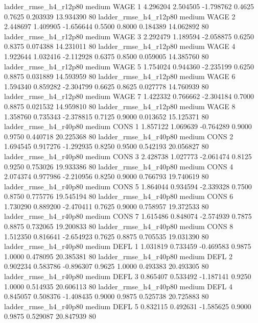  ladder_rmse_h4_r12p80     medium     WAGE                 1  4.296204 2.504505 -1.798762 0.4625 0.7625  0.203939   13.934390 80
 ladder_rmse_h4_r12p80     medium     WAGE                 2  2.448697 1.409905 -1.656644 0.5500 0.8000  0.184389   14.062892 80
 ladder_rmse_h4_r12p80     medium     WAGE                 3  2.292479 1.189594 -2.058875 0.6250 0.8375  0.074388   14.231011 80
 ladder_rmse_h4_r12p80     medium     WAGE                 4  1.922644 1.032416 -2.112928 0.6375 0.8500  0.059005   14.385760 80
 ladder_rmse_h4_r12p80     medium     WAGE                 5  1.754024 0.944360 -2.235199 0.6250 0.8875  0.031889   14.593959 80
 ladder_rmse_h4_r12p80     medium     WAGE                 6  1.594340 0.859282 -2.304799 0.6625 0.8625  0.027778   14.760939 80
 ladder_rmse_h4_r12p80     medium     WAGE                 7  1.422332 0.766662 -2.304184 0.7000 0.8875  0.021532   14.959810 80
 ladder_rmse_h4_r12p80     medium     WAGE                 8  1.358760 0.735343 -2.378815 0.7125 0.9000  0.013652   15.125371 80
 ladder_rmse_h4_r40p80     medium     CONS                 1  1.857122 1.069639 -0.764289 0.9000 0.9750  0.440718   20.225368 80
 ladder_rmse_h4_r40p80     medium     CONS                 2  1.694545 0.917276 -1.292935 0.8250 0.9500  0.542193   20.056827 80
 ladder_rmse_h4_r40p80     medium     CONS                 3  2.428738 1.027773 -2.061474 0.8125 0.9250  0.753026   19.933386 80
 ladder_rmse_h4_r40p80     medium     CONS                 4  2.074374 0.977986 -2.210956 0.8250 0.9000  0.766793   19.740619 80
 ladder_rmse_h4_r40p80     medium     CONS                 5  1.864044 0.934594 -2.339328 0.7500 0.8750  0.775776   19.545194 80
 ladder_rmse_h4_r40p80     medium     CONS                 6  1.730290 0.889200 -2.470411 0.7625 0.9000  0.758957   19.372533 80
 ladder_rmse_h4_r40p80     medium     CONS                 7  1.615486 0.848074 -2.574939 0.7875 0.8875  0.732065   19.200833 80
 ladder_rmse_h4_r40p80     medium     CONS                 8  1.512350 0.816641 -2.654923 0.7625 0.8875  0.705535   19.031390 80
 ladder_rmse_h4_r40p80     medium     DEFL                 1  1.031819 0.733459 -0.469583 0.9875 1.0000  0.478095   20.385381 80
 ladder_rmse_h4_r40p80     medium     DEFL                 2  0.902234 0.583786 -0.896307 0.9625 1.0000  0.493383   20.493305 80
 ladder_rmse_h4_r40p80     medium     DEFL                 3  0.865407 0.533492 -1.187141 0.9250 1.0000  0.514935   20.606113 80
 ladder_rmse_h4_r40p80     medium     DEFL                 4  0.845057 0.508376 -1.408435 0.9000 0.9875  0.525738   20.725883 80
 ladder_rmse_h4_r40p80     medium     DEFL                 5  0.832115 0.492631 -1.585625 0.9000 0.9875  0.529087   20.847939 80
